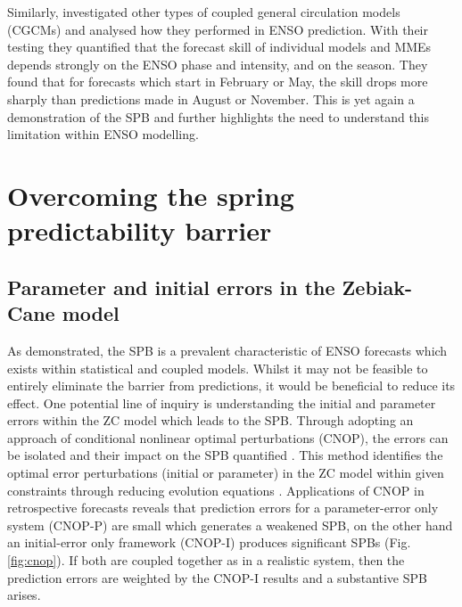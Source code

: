 \documentclass[12pt, onecolumn]{revtex4}    %
\begin{document}
Similarly, \cite{jin2008current} investigated other types of coupled general circulation models (CGCMs) and analysed how they performed in ENSO prediction. With their testing they quantified that the forecast skill of individual models and MMEs depends strongly on the ENSO phase and intensity, and on the season. They found that for forecasts which start in February or May, the skill drops more sharply than predictions made in August or November. This is yet again a demonstration of the SPB and further highlights the need to understand this limitation within ENSO modelling.

\section{Overcoming the spring predictability barrier}
\subsection{Parameter and initial errors in the Zebiak-Cane model}
\noindent
As demonstrated, the SPB is a prevalent characteristic of ENSO forecasts which exists within statistical and coupled models. Whilst it may not be feasible to entirely eliminate the barrier from predictions, it would be beneficial to reduce its effect. One potential line of inquiry is understanding the initial and parameter errors within the ZC model which leads to the SPB. Through adopting an approach of conditional nonlinear optimal perturbations (CNOP), the errors can be isolated and their impact on the SPB quantified \citep{duan2009exploring}. This method identifies the optimal error perturbations (initial or parameter) in the ZC model within given constraints through reducing evolution equations \citep{mu2010extension}. Applications of CNOP in retrospective forecasts reveals that prediction errors for a parameter-error only system (CNOP-P) are small which generates a weakened SPB, on the other hand an initial-error only framework (CNOP-I) produces significant SPBs (Fig. \ref{fig:cnop}). If both are coupled together as in a realistic system, then the prediction errors are weighted by the CNOP-I results and a substantive SPB arises. \\
\end{document}
